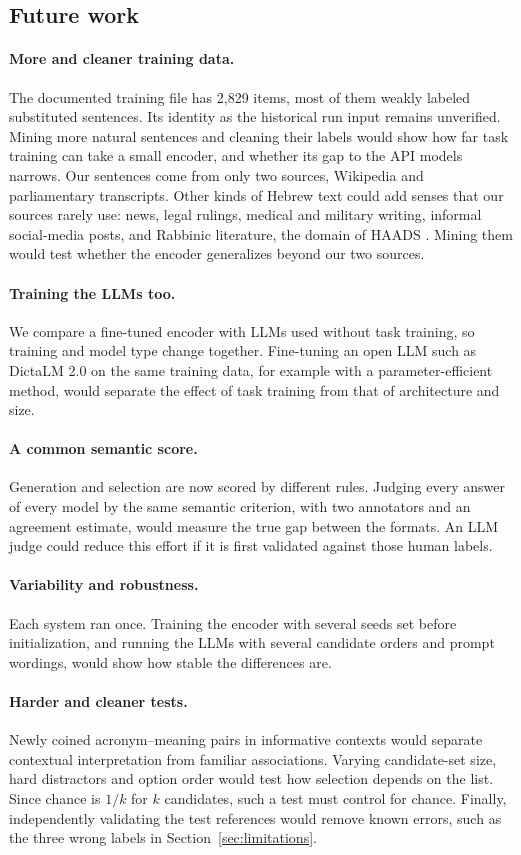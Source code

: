 \subsection{Future work}
\label{sec:future}
\paragraph{More and cleaner training data.} The documented training file has 2,829 items, most of them weakly labeled substituted sentences. Its identity as the historical run input remains unverified. Mining more natural sentences and cleaning their labels would show how far task training can take a small encoder, and whether its gap to the API models narrows. Our sentences come from only two sources, Wikipedia and parliamentary transcripts. Other kinds of Hebrew text could add senses that our sources rarely use: news, legal rulings, medical and military writing, informal social-media posts, and Rabbinic literature, the domain of HAADS \citep{hacohenkerner2010haads}. Mining them would test whether the encoder generalizes beyond our two sources.

\paragraph{Training the LLMs too.} We compare a fine-tuned encoder with LLMs used without task training, so training and model type change together. Fine-tuning an open LLM such as DictaLM 2.0 on the same training data, for example with a parameter-efficient method, would separate the effect of task training from that of architecture and size.

\paragraph{A common semantic score.} Generation and selection are now scored by different rules. Judging every answer of every model by the same semantic criterion, with two annotators and an agreement estimate, would measure the true gap between the formats. An LLM judge could reduce this effort if it is first validated against those human labels.

\paragraph{Variability and robustness.} Each system ran once. Training the encoder with several seeds set before initialization, and running the LLMs with several candidate orders and prompt wordings, would show how stable the differences are.

\paragraph{Harder and cleaner tests.} Newly coined acronym--meaning pairs in informative contexts would separate contextual interpretation from familiar associations. Varying candidate-set size, hard distractors and option order would test how selection depends on the list. Since chance is $1/k$ for $k$ candidates, such a test must control for chance. Finally, independently validating the test references would remove known errors, such as the three wrong labels in Section~\ref{sec:limitations}.
